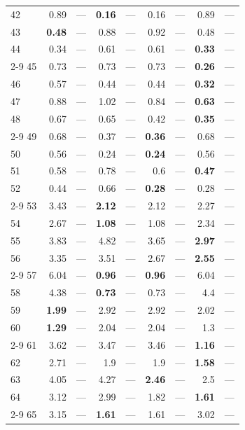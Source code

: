 \begin{longtable}{lr@{\hskip 4pt}l@{\hskip 12pt}r@{\hskip 4pt}l@{\hskip 12pt}r@{\hskip 4pt}l@{\hskip 12pt}r@{\hskip 4pt}l@{\hskip 12pt}}
42 & 0.89 & --- & \textbf{0.16} & --- & 0.16 & --- & 0.89 & --- \\
43 & \textbf{0.48} & --- & 0.88 & --- & 0.92 & --- & 0.48 & --- \\
44 & 0.34 & --- & 0.61 & --- & 0.61 & --- & \textbf{0.33} & --- \\
\cmidrule{2-9}
45 & 0.73 & --- & 0.73 & --- & 0.73 & --- & \textbf{0.26} & --- \\
46 & 0.57 & --- & 0.44 & --- & 0.44 & --- & \textbf{0.32} & --- \\
47 & 0.88 & --- & 1.02 & --- & 0.84 & --- & \textbf{0.63} & --- \\
48 & 0.67 & --- & 0.65 & --- & 0.42 & --- & \textbf{0.35} & --- \\
\cmidrule{2-9}
49 & 0.68 & --- & 0.37 & --- & \textbf{0.36} & --- & 0.68 & --- \\
50 & 0.56 & --- & 0.24 & --- & \textbf{0.24} & --- & 0.56 & --- \\
51 & 0.58 & --- & 0.78 & --- & 0.6 & --- & \textbf{0.47} & --- \\
52 & 0.44 & --- & 0.66 & --- & \textbf{0.28} & --- & 0.28 & --- \\
\cmidrule{2-9}
53 & 3.43 & --- & \textbf{2.12} & --- & 2.12 & --- & 2.27 & --- \\
54 & 2.67 & --- & \textbf{1.08} & --- & 1.08 & --- & 2.34 & --- \\
55 & 3.83 & --- & 4.82 & --- & 3.65 & --- & \textbf{2.97} & --- \\
56 & 3.35 & --- & 3.51 & --- & 2.67 & --- & \textbf{2.55} & --- \\
\cmidrule{2-9}
57 & 6.04 & --- & \textbf{0.96} & --- & \textbf{0.96} & --- & 6.04 & --- \\
58 & 4.38 & --- & \textbf{0.73} & --- & 0.73 & --- & 4.4 & --- \\
59 & \textbf{1.99} & --- & 2.92 & --- & 2.92 & --- & 2.02 & --- \\
60 & \textbf{1.29} & --- & 2.04 & --- & 2.04 & --- & 1.3 & --- \\
\cmidrule{2-9}
61 & 3.62 & --- & 3.47 & --- & 3.46 & --- & \textbf{1.16} & --- \\
62 & 2.71 & --- & 1.9 & --- & 1.9 & --- & \textbf{1.58} & --- \\
63 & 4.05 & --- & 4.27 & --- & \textbf{2.46} & --- & 2.5 & --- \\
64 & 3.12 & --- & 2.99 & --- & 1.82 & --- & \textbf{1.61} & --- \\
\cmidrule{2-9}
65 & 3.15 & --- & \textbf{1.61} & --- & 1.61 & --- & 3.02 & --- \\

\end{longtable}
